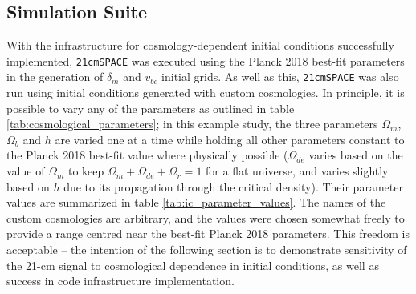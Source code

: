\documentclass[floats,floatfix,showpacs,amssymb,prd,superscriptaddress,nofootinbib]{revtex4-2} %
\newcommand{\code}{\texttt}
\begin{document}
\subsection{Simulation Suite}
With the infrastructure for cosmology-dependent initial conditions successfully implemented, \code{21cmSPACE} was executed using the Planck 2018 best-fit parameters \citep{Planck2018results} in the generation of $\delta_m$ and $v_{bc}$ initial grids. As well as this, \code{21cmSPACE} was also run using initial conditions generated with custom cosmologies. In principle, it is possible to vary any of the parameters as outlined in table \ref{tab:cosmological_parameters}; in this example study, the three parameters $\Omega_m$, $\Omega_b$ and $h$ are varied one at a time while holding all other parameters constant to the Planck 2018 best-fit value where physically possible ($\Omega_{de}$ varies based on the value of $\Omega_m$ to keep $\Omega_m + \Omega_{de} + \Omega_r= 1$ for a flat universe, and varies slightly based on $h$ due to its propagation through the critical density). Their parameter values are summarized in table \ref{tab:ic_parameter_values}. The names of the custom cosmologies are arbitrary, and the values were chosen somewhat freely to provide a range centred near the best-fit Planck 2018 parameters. This freedom is acceptable -- the intention of the following section is to demonstrate sensitivity of the 21-cm signal to cosmological dependence in initial conditions, as well as success in code infrastructure implementation.
\end{document}

